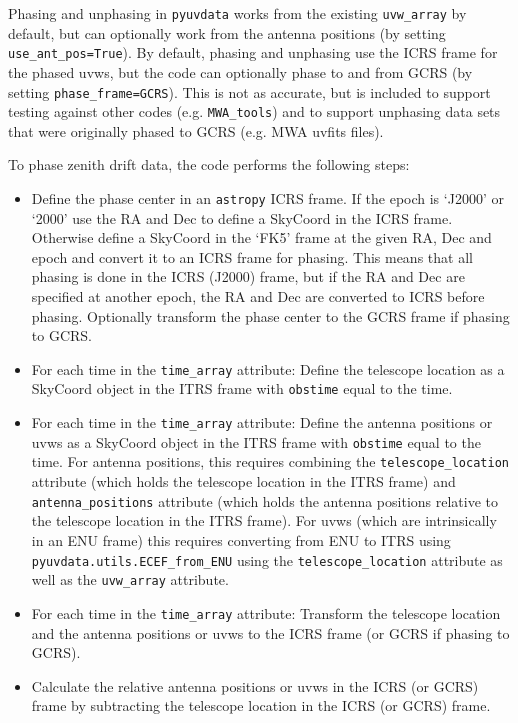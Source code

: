 \documentclass[11pt, oneside]{article}   	%
\begin{document}
Phasing and unphasing in \texttt{pyuvdata} works from the existing \verb!uvw_array! by default, but can optionally work from the antenna positions (by setting \verb!use_ant_pos=True!). By default, phasing and unphasing use the ICRS frame for the phased uvws, but the code can optionally phase to and from GCRS (by setting \verb!phase_frame=GCRS!). This is not as accurate, but is included to support testing against other codes (e.g. \verb!MWA_tools!) and to support unphasing data sets that were originally phased to GCRS (e.g. MWA uvfits files).

To phase zenith drift data, the code performs the following steps:
\begin{itemize}
\item{Define the phase center in an \texttt{astropy} ICRS frame. If the epoch is `J2000' or `2000' use the RA and Dec to define a SkyCoord in the ICRS frame. Otherwise define a SkyCoord in the `FK5' frame at the given RA, Dec and epoch and convert it to an ICRS frame for phasing. This means that all phasing is done in the ICRS (J2000) frame, but if the RA and Dec are specified at another epoch, the RA and Dec are converted to ICRS before phasing. Optionally transform the phase center to the GCRS frame if phasing to GCRS.}
\item{For each time in the \verb!time_array! attribute: Define the telescope location as a SkyCoord object in the ITRS frame with \verb!obstime! equal to the time.}
\item{For each time in the \verb!time_array! attribute: Define the antenna positions or uvws as a SkyCoord object in the ITRS frame with \verb!obstime! equal to the time. For antenna positions, this requires combining the \verb!telescope_location! attribute (which holds the telescope location in the ITRS frame) and \verb!antenna_positions! attribute (which holds the antenna positions relative to the telescope location in the ITRS frame). For uvws (which are intrinsically in an ENU frame) this requires converting from ENU to ITRS using \verb! pyuvdata.utils.ECEF_from_ENU! using the \verb!telescope_location! attribute as well as the \verb!uvw_array! attribute.}
\item{For each time in the \verb!time_array! attribute: Transform the telescope location and the antenna positions or uvws to the ICRS frame (or GCRS if phasing to GCRS).}
\item{Calculate the relative antenna positions or uvws in the ICRS (or GCRS) frame by subtracting the telescope location in the ICRS (or GCRS) frame.}

\end{itemize}
\end{document}
